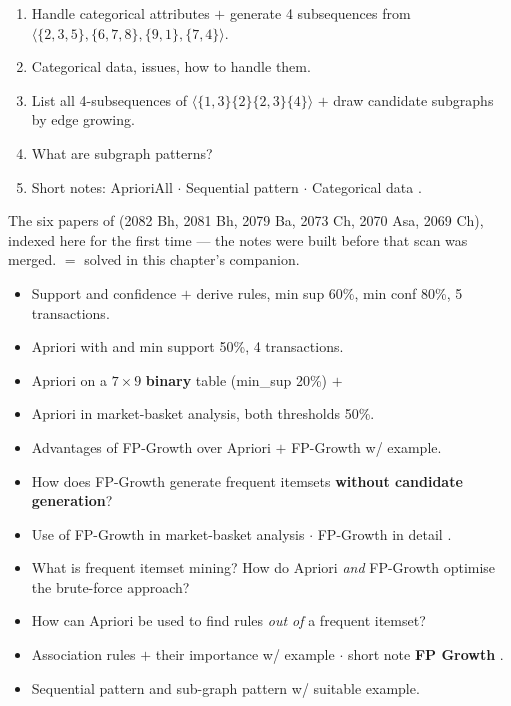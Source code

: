 \begin{enumerate}[start=23]
  \item {} Handle categorical attributes $+$ generate 4 subsequences from
        $\langle\{2,3,5\},\{6,7,8\},\{9,1\},\{7,4\}\rangle$. \hfill {} 
  \item {} Categorical data, issues, how to handle them. \hfill {} 
  \item {} List all 4-subsequences of $\langle\{1,3\}\{2\}\{2,3\}\{4\}\rangle$ $+$ draw
        candidate subgraphs by edge growing. \hfill {} 
  \item {} What are subgraph patterns? \hfill {} 
  \item {} Short notes: AprioriAll  $\cdot$ Sequential pattern  $\cdot$
        Categorical data . \hfill {}
\end{enumerate}

{\color{sub}\footnotesize The six papers of  (2082 Bh, 2081 Bh, 2079 Ba, 2073 Ch, 2070 Asa, 2069 Ch), indexed here for the
first time --- the notes were built before that scan was merged.  $=$ solved in this chapter's companion. \added}
\begin{itemize}
  \item {} Support and confidence $+$ derive rules, min sup 60\%, min conf 80\%, 5 transactions. \hfill {} 
  \item {} Apriori with  and min support 50\%, 4 transactions. \hfill {} 
  \item {} Apriori on a $7\times9$ \textbf{binary} table (min\_sup 20\%) $+$  \hfill {}  \added
  \item {} Apriori in market-basket analysis, both thresholds 50\%. \hfill {} 
  \item Advantages of FP-Growth over Apriori $+$ FP-Growth w/ example. \hfill {} 
  \item How does FP-Growth generate frequent itemsets \textbf{without candidate generation}? \hfill {} 
  \item Use of FP-Growth in market-basket analysis  $\cdot$ FP-Growth in detail . \hfill {}
  \item What is frequent itemset mining? How do Apriori \emph{and} FP-Growth optimise the brute-force approach? \hfill {} 
  \item How can Apriori be used to find rules \emph{out of} a frequent itemset? \hfill {} 
  \item Association rules $+$ their importance w/ example  $\cdot$ short note \textbf{FP Growth} . \hfill {}
  \item Sequential pattern and sub-graph pattern w/ suitable example. \hfill {} 
\end{itemize}

